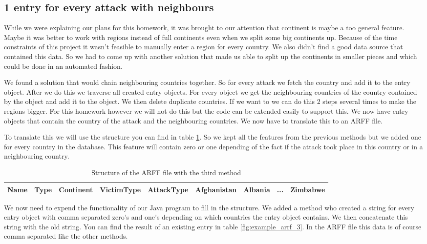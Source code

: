 \documentclass[a4]{article}
\begin{document}
\subsection{1 entry for every attack with neighbours}
\label{sec:withneighbours}
While we were explaining our plans for this homework, it was brought to our attention that continent is maybe a too general feature. Maybe it was better to work with regions instead of full continents even when we split some big continents up. Because of the time constraints of this project it wasn't feasible to manually enter a region for every country. We also didn't find a good data source that contained this data. So we had to come up with another solution that made us able to split up the continents in smaller pieces and which could be done in an automated fashion.\par
We found a solution that would chain neighbouring  countries together. So for every attack we fetch the country and add it to the entry object. After we do this we traverse all created entry objects. For every object we get the neighbouring countries of the country contained by the object and add it to the object. We then delete duplicate countries. If we want to we can do this 2 steps several times to make the regions bigger. For this homework however we will not do this but the code can be extended easily to support this. We now have entry objects that contain the country of the attack and the neighbouring countries. We now have to translate this to an ARFF file.\par
To translate this we will use the structure you can find in table \ref{fig:structure_arrf_3}. So we kept all the features from the previous methods but we added one for every country in the database. This feature will contain zero or one depending of the fact if the attack took place in this country or in a neighbouring country.\par
\begin{table}[!h]
\centering
\begin{tabular}{|c|c|c|c|c|c|c|c|c|}\hline
Name & Type & Continent & VictimType & AttackType & Afghanistan & Albania & ... & Zimbabwe \\ \hline
\end{tabular}
\caption{Structure of the ARFF file with the third method}
\label{fig:structure_arrf_3}
\end{table}
We now need to expend the functionality of our Java program to fill in the structure. We added a method who created a string for every entry object with comma separated zero's and one's depending on which countries the entry object contains. We then concatenate this string with the old string. You can find the result of an existing entry in table \ref{fig:example_arrf_3}. In the ARFF file this data is of course comma separated like the other methods.\par
\end{document}
